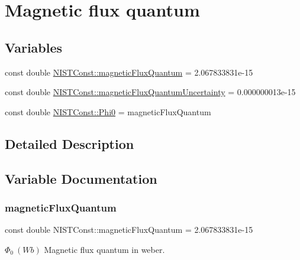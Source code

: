 \hypertarget{group___magnetic_flux_quantum}{}\section{Magnetic flux quantum}
\label{group___magnetic_flux_quantum}
\subsection*{Variables}
\begin{DoxyCompactItemize}
\item 
const double \hyperlink{group___magnetic_flux_quantum_ga2ed9e5fb19a6f2cc0c25ad945ea6b562}{N\+I\+S\+T\+Const\+::magnetic\+Flux\+Quantum} = 2.\+067833831e-\/15
\item 
const double \hyperlink{group___magnetic_flux_quantum_gabb501bffb2a565762d9f4bde15f859b6}{N\+I\+S\+T\+Const\+::magnetic\+Flux\+Quantum\+Uncertainty} = 0.\+000000013e-\/15
\item 
const double \hyperlink{group___magnetic_flux_quantum_ga17c4e5dc1a9ccc86990f9236ffbc42a3}{N\+I\+S\+T\+Const\+::\+Phi0} = magnetic\+Flux\+Quantum
\end{DoxyCompactItemize}


\subsection{Detailed Description}


\subsection{Variable Documentation}
\mbox{\label{group___magnetic_flux_quantum_ga2ed9e5fb19a6f2cc0c25ad945ea6b562}} 
\subsubsection{\texorpdfstring{magnetic\+Flux\+Quantum}{magneticFluxQuantum}}
{\footnotesize\ttfamily const double N\+I\+S\+T\+Const\+::magnetic\+Flux\+Quantum = 2.\+067833831e-\/15}

$\Phi_0 \ (Wb)$ Magnetic flux quantum in weber. \mbox{\label{group___magnetic_flux_quantum_gabb501bffb2a565762d9f4bde15f859b6}} 
